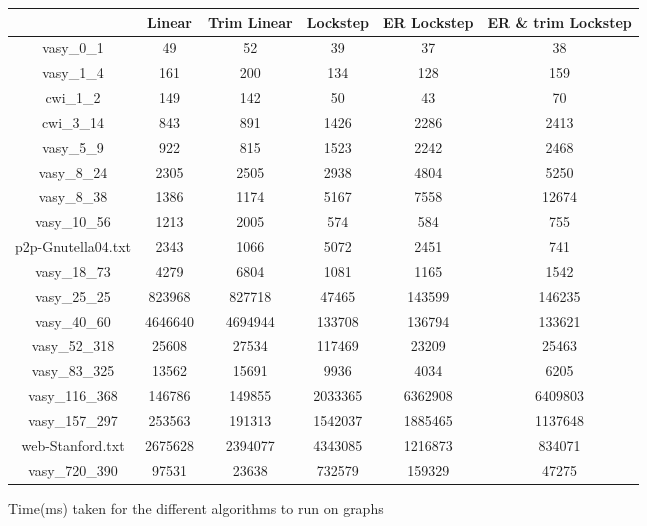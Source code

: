 \documentclass[../master/master.tex]{subfiles}
\begin{document}
\begin{figure}
\begin{tabular}{ |c||c||c||c||c||c|| } 
\hline
  & Linear & Trim Linear & Lockstep & ER Lockstep  & ER \& trim Lockstep \\
\hline
 vasy\_0\_1 & 49& 52& 39& 37& 38\\
\hline
 vasy\_1\_4 & 161& 200& 134& 128& 159\\
\hline
 cwi\_1\_2 & 149& 142& 50& 43& 70\\
\hline
 cwi\_3\_14 & 843& 891& 1426& 2286& 2413\\
\hline
 vasy\_5\_9 & 922& 815& 1523& 2242& 2468\\
\hline
 vasy\_8\_24 & 2305& 2505& 2938& 4804& 5250\\
\hline
 vasy\_8\_38 & 1386& 1174& 5167& 7558& 12674\\
\hline
 vasy\_10\_56 & 1213& 2005& 574& 584& 755\\
\hline
 p2p-Gnutella04.txt & 2343& 1066& 5072& 2451& 741\\
\hline
 vasy\_18\_73 & 4279& 6804& 1081& 1165& 1542\\
\hline
 vasy\_25\_25 & 823968& 827718& 47465& 143599& 146235\\
\hline
 vasy\_40\_60 & 4646640& 4694944& 133708& 136794& 133621\\
\hline
 vasy\_52\_318 & 25608& 27534& 117469& 23209& 25463\\
\hline
 vasy\_83\_325 & 13562& 15691& 9936& 4034& 6205\\
\hline
 vasy\_116\_368 & 146786& 149855& 2033365& 6362908& 6409803\\
\hline
 vasy\_157\_297 & 253563& 191313& 1542037& 1885465& 1137648\\
\hline
 web-Stanford.txt & 2675628& 2394077& 4343085& 1216873& 834071\\
\hline
 vasy\_720\_390 & 97531& 23638& 732579& 159329& 47275\\
\hline
\end{tabular}
\caption{Time(ms) taken for the different algorithms to run on graphs}\label{timeres}
\end{figure}
\end{document}
